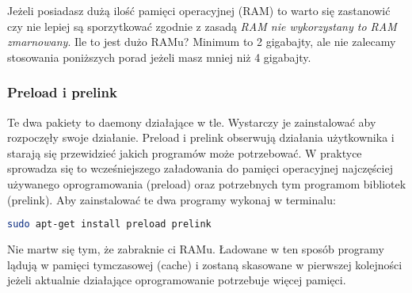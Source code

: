 Jeżeli posiadasz dużą ilość pamięci operacyjnej (RAM) to warto się zastanowić czy nie lepiej są sporzytkować zgodnie z zasadą \emph{RAM nie wykorzystany to RAM zmarnowany}. Ile to jest dużo RAMu? Minimum to 2 gigabajty, ale nie zalecamy stosowania poniższych porad jeżeli masz mniej niż 4 gigabajty.

\subsubsection{Preload i prelink}
Te dwa pakiety to daemony działające w tle. Wystarczy je zainstalować aby rozpoczęły swoje działanie. \textcolor{ubuntu_orange}{Preload i prelink} obserwują działania użytkownika i starają się przewidzieć jakich programów może potrzebować. W praktyce sprowadza się to wcześniejszego załadowania do pamięci operacyjnej najczęściej używanego oprogramowania (preload) oraz potrzebnych tym programom bibliotek (prelink). Aby zainstalować te dwa programy wykonaj w terminalu:
\begin{lstlisting}[language=bash]
sudo apt-get install preload prelink
\end{lstlisting}
Nie martw się tym, że zabraknie ci RAMu. Ładowane w ten sposób programy lądują w pamięci tymczasowej (cache) i zostaną skasowane w pierwszej kolejności jeżeli aktualnie działające oprogramowanie potrzebuje więcej pamięci.


